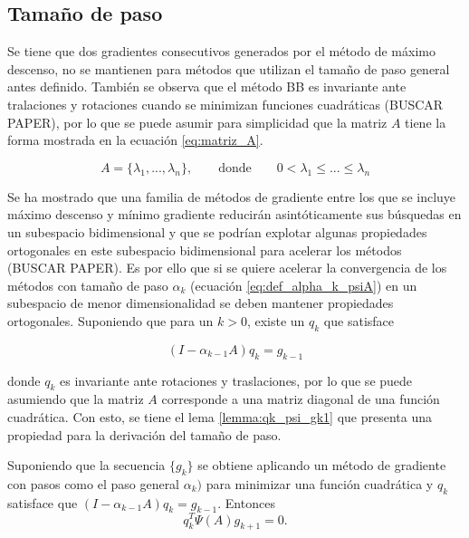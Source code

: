 \subsection*{Tamaño de paso}


Se tiene que dos gradientes consecutivos generados por el método de máximo descenso, no se mantienen para métodos que utilizan el tamaño de paso general antes definido. También se observa que el método BB es invariante ante tralaciones y rotaciones cuando se minimizan funciones cuadráticas (BUSCAR PAPER), por lo que se puede asumir para simplicidad que la matriz $A$ tiene la forma mostrada en la ecuación \ref{eq:matriz_A}.

\begin{equation}
	A = \{\lambda_1, ..., \lambda_n\}, \qquad \text{donde} \qquad 0<\lambda_1\leq...\leq\lambda_n \label{eq:matriz_A}
\end{equation}


Se ha mostrado que una familia de métodos de gradiente entre los que se incluye máximo descenso y mínimo gradiente reducirán asintóticamente sus búsquedas en un subespacio bidimensional y que se podrían explotar algunas propiedades ortogonales en este subespacio bidimensional para acelerar los métodos (BUSCAR PAPER). %
Es por ello que si se quiere acelerar la convergencia de los métodos con tamaño de paso $\alpha_k$ (ecuación \ref{eq:def_alpha_k_psiA}) en un subespacio de menor dimensionalidad se deben mantener propiedades ortogonales. Suponiendo que para un $k>0$, existe un $q_k$ que satisface

\begin{equation*}
	(I-\alpha_{k-1}A)q_k = g_{k-1}
\end{equation*}

donde $q_k$ es invariante ante rotaciones y traslaciones, por lo que se puede asumiendo que la matriz $A$ corresponde a una matriz diagonal de una función cuadrática. Con esto, se tiene el lema \ref{lemma:qk_psi_gk1} que presenta una propiedad para la derivación del tamaño de paso.

\begin{lema}
	Suponiendo que la secuencia $\{g_k\}$ se obtiene aplicando un método de gradiente con pasos como el paso general $\alpha_k)$ para minimizar una función cuadrática y $q_k$ satisface que $(I-\alpha_{k-1}A)q_k = g_{k-1}$. Entonces
	\begin{equation*}
		q_k^T\Psi(A)g_{k+1} = 0.
	\end{equation*}
	\label{lemma:qk_psi_gk1}
\end{lema}

